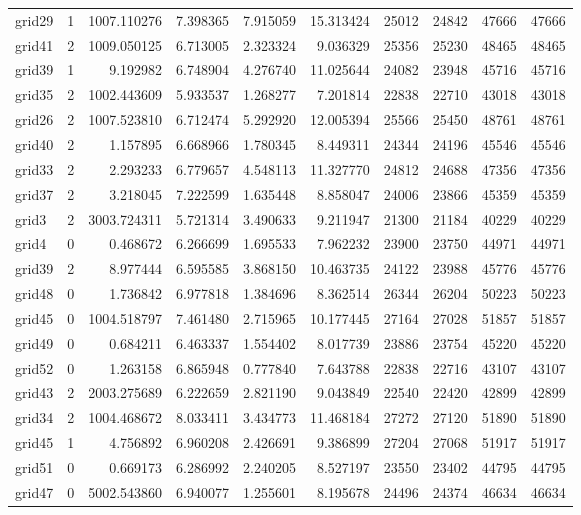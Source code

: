 \begin{longtable}{|l|r|r|r|r|r|r|r|r|r|}
grid29 & 1 & 1007.110276 & 7.398365 & 7.915059 & 15.313424 & 25012 & 24842 & 47666 & 47666 \\
grid41 & 2 & 1009.050125 & 6.713005 & 2.323324 & 9.036329 & 25356 & 25230 & 48465 & 48465 \\
grid39 & 1 & 9.192982 & 6.748904 & 4.276740 & 11.025644 & 24082 & 23948 & 45716 & 45716 \\
grid35 & 2 & 1002.443609 & 5.933537 & 1.268277 & 7.201814 & 22838 & 22710 & 43018 & 43018 \\
grid26 & 2 & 1007.523810 & 6.712474 & 5.292920 & 12.005394 & 25566 & 25450 & 48761 & 48761 \\
grid40 & 2 & 1.157895 & 6.668966 & 1.780345 & 8.449311 & 24344 & 24196 & 45546 & 45546 \\
grid33 & 2 & 2.293233 & 6.779657 & 4.548113 & 11.327770 & 24812 & 24688 & 47356 & 47356 \\
grid37 & 2 & 3.218045 & 7.222599 & 1.635448 & 8.858047 & 24006 & 23866 & 45359 & 45359 \\
grid3 & 2 & 3003.724311 & 5.721314 & 3.490633 & 9.211947 & 21300 & 21184 & 40229 & 40229 \\
grid4 & 0 & 0.468672 & 6.266699 & 1.695533 & 7.962232 & 23900 & 23750 & 44971 & 44971 \\
grid39 & 2 & 8.977444 & 6.595585 & 3.868150 & 10.463735 & 24122 & 23988 & 45776 & 45776 \\
grid48 & 0 & 1.736842 & 6.977818 & 1.384696 & 8.362514 & 26344 & 26204 & 50223 & 50223 \\
grid45 & 0 & 1004.518797 & 7.461480 & 2.715965 & 10.177445 & 27164 & 27028 & 51857 & 51857 \\
grid49 & 0 & 0.684211 & 6.463337 & 1.554402 & 8.017739 & 23886 & 23754 & 45220 & 45220 \\
grid52 & 0 & 1.263158 & 6.865948 & 0.777840 & 7.643788 & 22838 & 22716 & 43107 & 43107 \\
grid43 & 2 & 2003.275689 & 6.222659 & 2.821190 & 9.043849 & 22540 & 22420 & 42899 & 42899 \\
grid34 & 2 & 1004.468672 & 8.033411 & 3.434773 & 11.468184 & 27272 & 27120 & 51890 & 51890 \\
grid45 & 1 & 4.756892 & 6.960208 & 2.426691 & 9.386899 & 27204 & 27068 & 51917 & 51917 \\
grid51 & 0 & 0.669173 & 6.286992 & 2.240205 & 8.527197 & 23550 & 23402 & 44795 & 44795 \\
grid47 & 0 & 5002.543860 & 6.940077 & 1.255601 & 8.195678 & 24496 & 24374 & 46634 & 46634 \\

\end{longtable}
